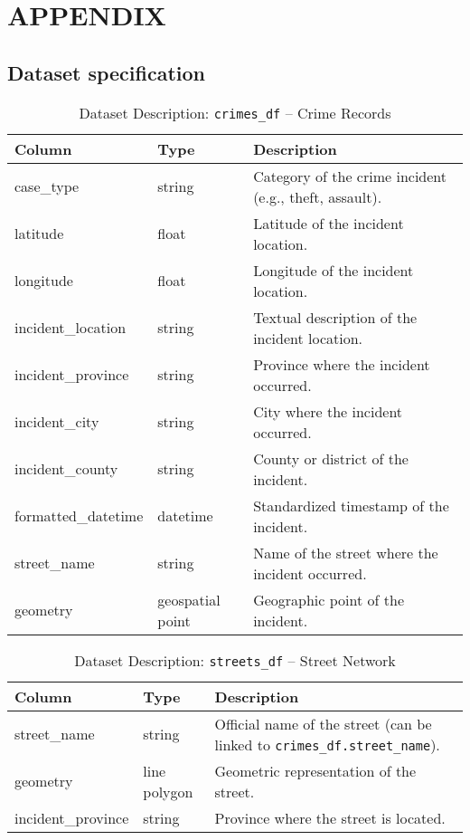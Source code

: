 \chapter*{\center \Large APPENDIX} 

\appendix
\renewcommand{\thesection}{A.\arabic{section}}


\section{Dataset specification}
\label{appendix:dataset}



\begin{table}[H]
\centering
\scriptsize
\begin{tabular}{|l|l|p{8cm}|}
  \hline
\textbf{Column} & \textbf{Type} & \textbf{Description} \\
\hline
case\_type & string & Category of the crime incident (e.g., theft, assault). \\
latitude & float & Latitude of the incident location. \\
longitude & float & Longitude of the incident location. \\
incident\_location & string & Textual description of the incident location. \\
incident\_province & string & Province where the incident occurred. \\
incident\_city & string & City where the incident occurred. \\
incident\_county & string & County or district of the incident. \\
formatted\_datetime & datetime & Standardized timestamp of the incident. \\
street\_name & string & Name of the street where the incident occurred. \\
geometry & geospatial point & Geographic point of the incident. \\
\hline
\end{tabular}
\caption{Dataset Description: \texttt{crimes\_df} – Crime Records}
\end{table}


\begin{table}[H]
\centering
\scriptsize
\begin{tabular}{|l|l|p{8cm}|}
  \hline
  \textbf{Column} & \textbf{Type} & \textbf{Description} \\
\hline
street\_name & string & Official name of the street (can be linked to \texttt{crimes\_df.street\_name}). \\
geometry & line polygon & Geometric representation of the street. \\
incident\_province & string & Province where the street is located. \\
\hline
\end{tabular}
\caption{Dataset Description: \texttt{streets\_df} – Street Network}
\end{table}


